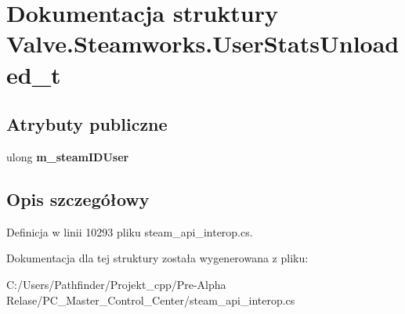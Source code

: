 \hypertarget{struct_valve_1_1_steamworks_1_1_user_stats_unloaded__t}{}\section{Dokumentacja struktury Valve.\+Steamworks.\+User\+Stats\+Unloaded\+\_\+t}
\label{struct_valve_1_1_steamworks_1_1_user_stats_unloaded__t}
\subsection*{Atrybuty publiczne}
\begin{DoxyCompactItemize}
\item 
\mbox{\label{struct_valve_1_1_steamworks_1_1_user_stats_unloaded__t_ae7445e0a5e82f55970a740c89f367b9b}} 
ulong {\bfseries m\+\_\+steam\+I\+D\+User}
\end{DoxyCompactItemize}


\subsection{Opis szczegółowy}


Definicja w linii 10293 pliku steam\+\_\+api\+\_\+interop.\+cs.



Dokumentacja dla tej struktury została wygenerowana z pliku\+:\begin{DoxyCompactItemize}
\item 
C\+:/\+Users/\+Pathfinder/\+Projekt\+\_\+cpp/\+Pre-\/\+Alpha Relase/\+P\+C\+\_\+\+Master\+\_\+\+Control\+\_\+\+Center/steam\+\_\+api\+\_\+interop.\+cs\end{DoxyCompactItemize}
